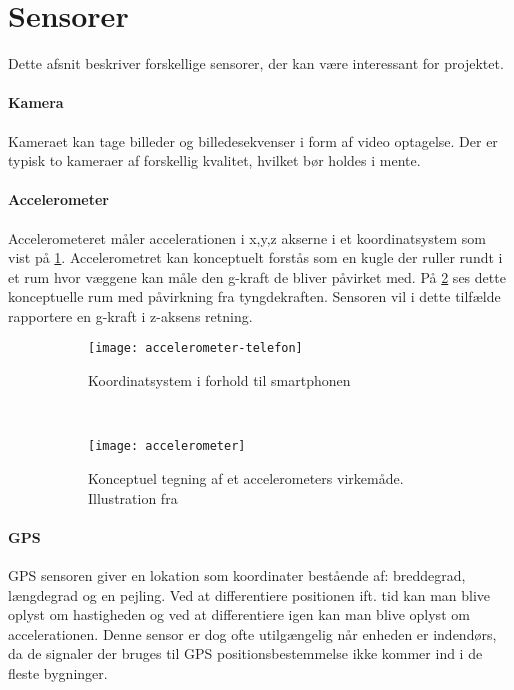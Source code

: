 \section{Sensorer}\label{sensorer}
Dette afsnit beskriver forskellige sensorer, der kan være interessant for projektet. 

\paragraph{Kamera}
Kameraet kan tage billeder og billedesekvenser i form af video optagelse.
Der er typisk to kameraer af forskellig kvalitet, hvilket bør holdes i mente.

\paragraph{Accelerometer}
Accelerometeret måler accelerationen i x,y,z akserne i et koordinatsystem som vist på \cref{analyse:accelerometer:koo}.
Accelerometret kan konceptuelt forstås som en kugle der ruller rundt i et rum hvor væggene kan måle den g-kraft de bliver påvirket med.
På \cref{analyse:accelerometer:kraft} ses dette konceptuelle rum med påvirkning fra tyngdekraften. 
Sensoren vil i dette tilfælde rapportere en g-kraft i z-aksens retning.

\begin{figure}[h]
	\centering
	\begin{subfigure}[b]{0.47\textwidth}
		\centering
		\texttt{[image: accelerometer-telefon]}
		\caption{Koordinatsystem i forhold til smartphonen}
		\label{analyse:accelerometer:koo}
	\end{subfigure}
	~
	\begin{subfigure}[b]{0.47\textwidth}
		\centering
		\texttt{[image: accelerometer]}
		\caption{Konceptuel tegning af et accelerometers virkemåde. Illustration fra \cite{accelerometer}}
		\label{analyse:accelerometer:kraft}
	\end{subfigure}
	\caption{}
	\label{accelerometer}
\end{figure} 

\paragraph{GPS}
GPS sensoren giver en lokation som koordinater bestående af: breddegrad, længdegrad og en pejling.
Ved at differentiere positionen ift. tid kan man blive oplyst om hastigheden og ved at differentiere igen kan man blive oplyst om accelerationen.
Denne sensor er dog ofte utilgængelig når enheden er indendørs, da de signaler der bruges til GPS positionsbestemmelse ikke kommer ind i de fleste bygninger.

